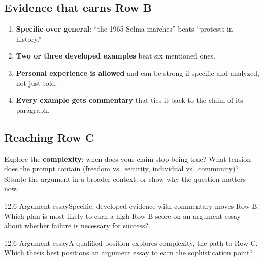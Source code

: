 \documentclass[11pt]{article}
\begin{document}
\subsection{Evidence that earns Row B}
\begin{enumerate}[leftmargin=1.5em]
\item \textbf{Specific over general}: ``the 1965 Selma marches'' beats ``protests in history.''
\item \textbf{Two or three developed examples} beat six mentioned ones.
\item \textbf{Personal experience is allowed} and can be strong if specific and analyzed, not just told.
\item \textbf{Every example gets commentary} that ties it back to the claim of its paragraph.
\end{enumerate}

\subsection{Reaching Row C}
Explore the \textbf{complexity}: when does your claim stop being true? What tension does the prompt contain (freedom vs.\ security, individual vs.\ community)? Situate the argument in a broader context, or show why the question matters now.

\begin{q}{1}{2.6 Argument essay}{Specific, developed evidence with commentary moves Row B.}
Which plan is most likely to earn a high Row B score on an argument essay about whether failure is necessary for success?
\end{q}

\begin{q}{1}{2.6 Argument essay}{A qualified position explores complexity, the path to Row C.}
Which thesis best positions an argument essay to earn the sophistication point?
\end{q}

\makekey
\end{document}
